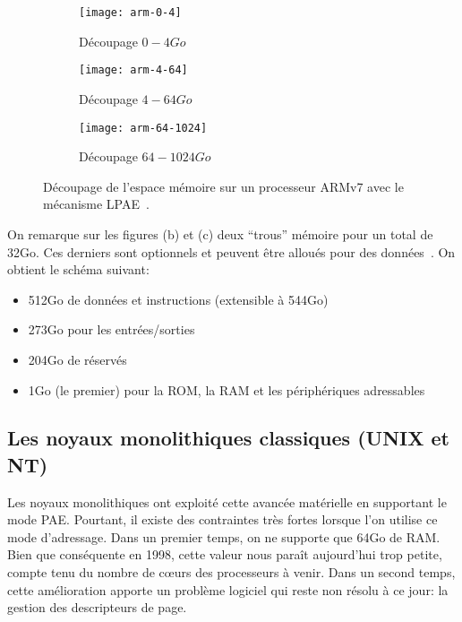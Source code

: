       \begin{figure}[ht]
        \begin{subfigure}[b]{0.37\linewidth}
          \texttt{[image: arm-0-4]}
          \caption{Découpage $0-4Go$}
          \label{fig:arm-0-4}
        \end{subfigure}
        \begin{subfigure}[b]{0.37\textwidth}
          \texttt{[image: arm-4-64]}
          \caption{Découpage $4-64Go$}
          \label{fig:arm-4-64}
        \end{subfigure}
        \begin{subfigure}[b]{0.23\textwidth}
          \texttt{[image: arm-64-1024]}
          \caption{Découpage $64-1024Go$}
          \label{fig:arm-64-1024}
        \end{subfigure}
        \caption{Découpage de l'espace mémoire sur un processeur ARMv7 avec le
          mécanisme LPAE~\citep{arm2012principles}.}
        \label{fig:arm-0-1024}
      \end{figure}

      On remarque sur les figures (b) et (c) deux ``trous'' mémoire pour un
      total de 32Go. Ces derniers sont optionnels et peuvent être alloués pour
      des données~\citep{arm2012principles}. On obtient le schéma suivant:

      \begin{itemize}
        \item 512Go de données et instructions (extensible à 544Go)
        \item 273Go pour les entrées/sorties
        \item 204Go de réservés
        \item 1Go (le premier) pour la ROM,
          la RAM et les périphériques adressables
      \end{itemize}


    \subsection{Les noyaux monolithiques classiques (UNIX et NT)}

      Les noyaux monolithiques ont exploité cette avancée matérielle en
      supportant le mode PAE. Pourtant, il existe des contraintes très fortes
      lorsque l'on utilise ce mode d'adressage. Dans un premier temps, on ne
      supporte que 64Go de RAM. Bien que conséquente en 1998, cette valeur nous
      paraît aujourd'hui trop petite, compte tenu du nombre de c\oe urs des
      processeurs à venir. Dans un second temps, cette amélioration apporte un
      problème logiciel qui reste non résolu à ce jour: la gestion des
      descripteurs de page.\\

